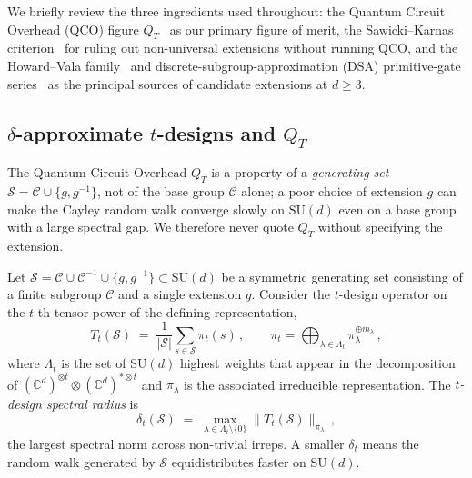 \documentclass[twocolumn,superscriptaddress,showpacs,nofootinbib,notitlepage,preprintnumbers,secnumarabic,amssymb, nobibnotes, aps, prd]{revtex4-2}
\newcommand{\QT}{Q_{T}}              %
\begin{document}
We briefly review the three ingredients used throughout: the Quantum Circuit Overhead (QCO) figure $\QT$~\cite{Slowik:2025qco} as our primary figure of merit, the Sawicki--Karnas criterion~\cite{Sawicki:2016kmo} for ruling out non-universal extensions without running QCO, and the Howard--Vala family~\cite{Howard:2012fva} and discrete-subgroup-approximation (DSA) primitive-gate series~\cite{Lamm:2019bik,Gustafson:2022xdt} as the principal sources of candidate extensions at $d \geq 3$.

\subsection{$\delta$-approximate $t$-designs and $\QT$}\label{sec:qco_qt}

The Quantum Circuit Overhead $\QT$ is a property of a \emph{generating set} $\mathcal{S} = \mathcal{C}\cup\{g, g^{-1}\}$, not of the base group $\mathcal{C}$ alone; a poor choice of extension $g$ can make the Cayley random walk converge slowly on $\mathrm{SU}(d)$ even on a base group with a large spectral gap. We therefore never quote $\QT$ without specifying the extension.

Let $\mathcal{S} = \mathcal{C} \cup \mathcal{C}^{-1} \cup \{g,g^{-1}\} \subset \mathrm{SU}(d)$ be a symmetric generating set consisting of a finite subgroup $\mathcal{C}$ and a single extension $g$. Consider the $t$-design operator on the $t$-th tensor power of the defining representation,
\begin{equation}
  T_t(\mathcal{S}) \;=\; \frac{1}{|\mathcal{S}|} \sum_{s \in \mathcal{S}} \pi_t(s)\,, \qquad \pi_t = \bigoplus_{\lambda \in \Lambda_t} \pi_\lambda^{\oplus m_\lambda}\,,
  \label{eq:tdesign}
\end{equation}
where $\Lambda_t$ is the set of $\mathrm{SU}(d)$ highest weights that appear in the decomposition of $(\mathbb{C}^d)^{\otimes t} \otimes (\mathbb{C}^d)^{*\otimes t}$ and $\pi_\lambda$ is the associated irreducible representation. The \emph{$t$-design spectral radius} is
\begin{equation}
  \delta_t(\mathcal{S}) \;=\; \max_{\lambda \in \Lambda_t \setminus \{0\}} \bigl\lVert T_t(\mathcal{S})\bigr\rVert_{\pi_\lambda}\,,
  \label{eq:delta_def}
\end{equation}
the largest spectral norm across non-trivial irreps. A smaller $\delta_t$ means the random walk generated by $\mathcal{S}$ equidistributes faster on $\mathrm{SU}(d)$.
\end{document}
